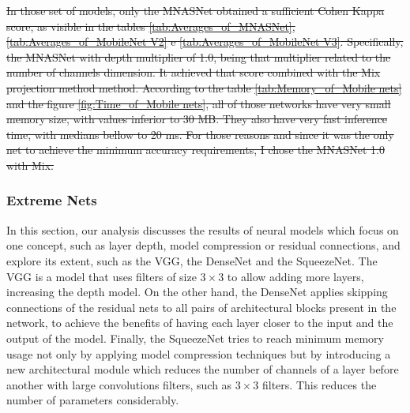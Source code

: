 \sout{
In those set of models, only the MNASNet obtained a sufficient Cohen Kappa score, as visible in the tables \ref{tab:Averages_of_MNASNet}, \ref{tab:Averages_of_MobileNet V2} e \ref{tab:Averages_of_MobileNet V3}. Specifically, the MNASNet with depth multiplier of 1.0, being that multiplier related to the number of channels dimension. It achieved that score combined with the \gls{Mix} projection method method. According to the table \ref{tab:Memory_of_Mobile nets} and the figure \ref{fig:Time_of_Mobile nets}, all of those networks have very small memory size, with values inferior to 30 MB. They also have very fast inference time, with medians bellow to 20 ms. For those reasons and since it was the only net to achieve the minimum accuracy requirements, I chose the MNASNet 1.0 with \gls{Mix}.
}






\FloatBarrier

\subsubsection{Extreme Nets}

In this section, our analysis discusses the results of neural models which focus on one concept, such as layer depth, model compression or residual connections, and explore its extent, such as the VGG, the DenseNet and the SqueezeNet. The VGG is a model that uses filters of size $3\times 3$ to allow adding more layers, increasing the depth model. On the other hand, the DenseNet applies skipping connections of the residual nets to all pairs of architectural blocks present in the network, to achieve the benefits of having each layer closer to the input and the output of the model. Finally, the SqueezeNet tries to reach minimum memory usage not only by applying model compression techniques but by introducing a new architectural module which reduces the number of channels of a layer before another with large convolutions filters, such as $3 \times 3$ filters. This reduces the number of parameters considerably.

